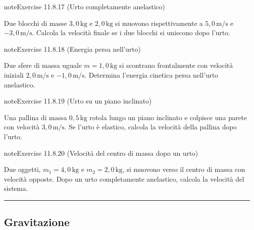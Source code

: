 \documentclass[letterpaper,10pt,italian]{jupyterBook}
\begin{document}
\begin{sphinxadmonition}{note}{Exercise 11.8.17 (Urto completamente anelastico)}



\sphinxAtStartPar
Due blocchi di masse \(3,0 \, \text{kg}\) e \(2,0 \, \text{kg}\) si muovono rispettivamente a \(5,0 \, \text{m/s}\) e \(-3,0 \, \text{m/s}\). Calcola la velocità finale se i due blocchi si uniscono dopo l’urto.
\end{sphinxadmonition}
 \label{exercise:ch/mechanics/dynamics-problems-exercise-17}

\begin{sphinxadmonition}{note}{Exercise 11.8.18 (Energia persa nell’urto)}



\sphinxAtStartPar
Due sfere di massa uguale \(m = 1,0 \, \text{kg}\) si scontrano frontalmente con velocità iniziali \(2,0 \, \text{m/s}\) e \(-1,0 \, \text{m/s}\). Determina l’energia cinetica persa nell’urto anelastico.
\end{sphinxadmonition}
 \label{exercise:ch/mechanics/dynamics-problems-exercise-18}

\begin{sphinxadmonition}{note}{Exercise 11.8.19 (Urto su un piano inclinato)}



\sphinxAtStartPar
Una pallina di massa \(0,5 \, \text{kg}\) rotola lungo un piano inclinato e colpisce una parete con velocità \(3,0 \, \text{m/s}\). Se l’urto è elastico, calcola la velocità della pallina dopo l’urto.
\end{sphinxadmonition}
 \label{exercise:ch/mechanics/dynamics-problems-exercise-19}

\begin{sphinxadmonition}{note}{Exercise 11.8.20 (Velocità del centro di massa dopo un urto)}



\sphinxAtStartPar
Due oggetti, \(m_1 = 4,0 \, \text{kg}\) e \(m_2 = 2,0 \, \text{kg}\), si muovono verso il centro di massa con velocità opposte. Dopo un urto completamente anelastico, calcola la velocità del sistema.
\end{sphinxadmonition}


\bigskip\hrule\bigskip



\subsection{Gravitazione}
\label{\detokenize{ch/mechanics/dynamics-problems:gravitazione}} \label{exercise:ch/mechanics/dynamics-problems-exercise-20}
\end{document}
